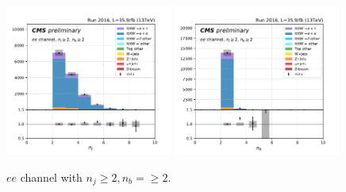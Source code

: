 \begin{figure}[ht]
    \includegraphics[width=0.49\textwidth]{chapters/Appendix/sectionPlots/figures/kinematics_pickles/ee/2b/ee_2b_nJets.pdf}
    \includegraphics[width=0.49\textwidth]{chapters/Appendix/sectionPlots/figures/kinematics_pickles/ee/2b/ee_2b_nBJets.pdf}
    
    \caption{$ee$ channel with $n_j\geq2, n_b=\geq2$.}
\end{figure}

